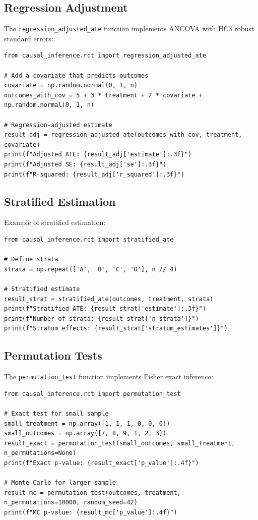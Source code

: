 \subsection{Regression Adjustment}

The \texttt{regression\_adjusted\_ate} function implements ANCOVA with HC3 robust standard errors:

\begin{verbatim}
from causal_inference.rct import regression_adjusted_ate

# Add a covariate that predicts outcomes
covariate = np.random.normal(0, 1, n)
outcomes_with_cov = 5 + 3 * treatment + 2 * covariate + np.random.normal(0, 1, n)

# Regression-adjusted estimate
result_adj = regression_adjusted_ate(outcomes_with_cov, treatment, covariate)
print(f"Adjusted ATE: {result_adj['estimate']:.3f}")
print(f"Adjusted SE: {result_adj['se']:.3f}")
print(f"R-squared: {result_adj['r_squared']:.3f}")
\end{verbatim}

\subsection{Stratified Estimation}

Example of stratified estimation:

\begin{verbatim}
from causal_inference.rct import stratified_ate

# Define strata
strata = np.repeat(['A', 'B', 'C', 'D'], n // 4)

# Stratified estimate
result_strat = stratified_ate(outcomes, treatment, strata)
print(f"Stratified ATE: {result_strat['estimate']:.3f}")
print(f"Number of strata: {result_strat['n_strata']}")
print(f"Stratum effects: {result_strat['stratum_estimates']}")
\end{verbatim}

\subsection{Permutation Tests}

The \texttt{permutation\_test} function implements Fisher exact inference:

\begin{verbatim}
from causal_inference.rct import permutation_test

# Exact test for small sample
small_treatment = np.array([1, 1, 1, 0, 0, 0])
small_outcomes = np.array([7, 8, 9, 1, 2, 3])
result_exact = permutation_test(small_outcomes, small_treatment, n_permutations=None)
print(f"Exact p-value: {result_exact['p_value']:.4f}")

# Monte Carlo for larger sample
result_mc = permutation_test(outcomes, treatment, n_permutations=10000, random_seed=42)
print(f"MC p-value: {result_mc['p_value']:.4f}")
\end{verbatim}


